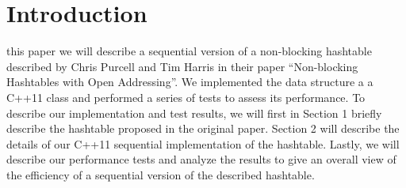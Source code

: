 \documentclass[journal]{IEEEtran}
\begin{document}
\section{Introduction}
% 
% 
% 
% 
 this paper we will describe a  sequential version of a non-blocking hashtable described by Chris Purcell and Tim Harris in their paper “Non-blocking Hashtables with Open Addressing”. We implemented the data structure a a C++11 class and performed a series of tests to assess its performance.
To describe our implementation and test results, we will first in Section 1 briefly describe the hashtable proposed in the original paper. Section 2 will describe the details of our C++11 sequential implementation of the hashtable. Lastly, we will describe our performance tests and analyze the results to give an overall view of the efficiency of a sequential version of the described hashtable.



 





%
%
\end{document}
